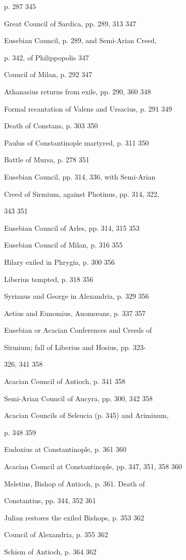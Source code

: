 p. 287
345

Great Council of Sardica, pp. 289, 313
347

Eusebian Council, p. 289, and Semi-Arian
Creed, 

p. 342, of Philippopolis
347

Council of Milan, p. 292
347

Athanasius returns from exile, pp. 290, 360
348

Formal recantation of Valens and Ursacius, p.
291
349

Death of Constans, p. 303
350

Paulus of Constantinople martyred, p. 311
350

Battle of Mursa, p. 278
351

Eusebian Council, pp. 314, 336, with Semi-Arian

Creed of Sirmium, against Photinus, pp.
314, 322,

343
351

Eusebian Council of Arles, pp. 314, 315
353

Eusebian Council of Milan, p. 316
355

Hilary exiled in Phrygia, p. 300
356

Liberius tempted, p. 318
356

Syrianus and George in Alexandria, p. 329
356

Aetius and Eunomius, Anomœans, p. 337
357

Eusebian or Acacian Conferences and Creeds of

Sirmium; fall of Liberius and Hosius, pp.
323-

326, 341
358

Acacian Council of Antioch, p. 341
358

Semi-Arian Council of Ancyra, pp. 300, 342
358

Acacian Councils of Seleucia (p. 345) and
Ariminum,

p. 348
359

Eudoxius at Constantinople, p. 361
360

Acacian Council at Constantinople, pp. 347,
351, 358
360

Meletius, Bishop of Antioch, p. 361. Death of

Constantius, pp. 344, 352
361

Julian restores the exiled Bishops, p. 353
362

Council of Alexandria, p. 355
362

Schism of Antioch, p. 364
362

